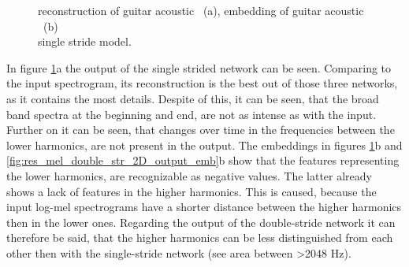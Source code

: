 \begin{figure}[htb!]
    \centering
    \captionsetup{justification=centering}
    \caption{reconstruction of guitar acoustic ~(a), embedding of guitar acoustic ~(b)\\single stride model.}
    \label{fig:res_mel_single_str_2D_output_emb}
\end{figure}

In figure \ref{fig:res_mel_single_str_2D_output_emb}a the output of the single strided network can be seen. Comparing to the input spectrogram, its reconstruction is the best out of those three networks, as it contains the most details. Despite of this, it can be seen, that the broad band spectra at the beginning and end, are not as intense as with the input. Further on it can be seen, that changes over time in the frequencies between the lower harmonics, are not present in the output. The embeddings in figures \ref{fig:res_mel_single_str_2D_output_emb}b and \ref{fig:res_mel_double_str_2D_output_emb}b show that the features representing the lower harmonics, are recognizable as negative values. The latter already shows a lack of features in the higher harmonics. This is caused, because the input log-mel spectrograms have a shorter distance between the higher harmonics then in the lower ones. Regarding the output of the double-stride network it can therefore be said, that the higher harmonics can be less distinguished from each other then with the single-stride network (see area between >2048 Hz).


